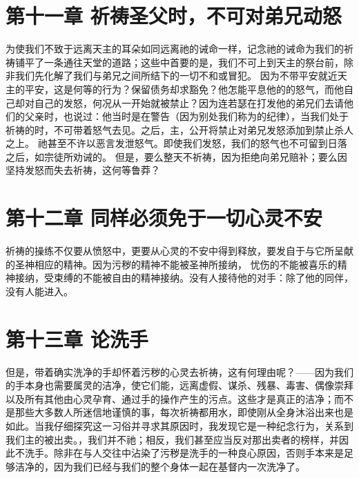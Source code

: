 
\section{第十一章 祈祷圣父时，不可对弟兄动怒}

为使我们不致于远离天主的耳朵如同远离祂的诫命一样，记念祂的诫命为我们的祈祷铺平了一条通往天堂的道路；这些中首要的是，我们不可上到天主的祭台前，除非我们先化解了我们与弟兄之间所结下的一切不和或冒犯。 因为不带平安就近天主的平安，这是何等的行为？保留债务却求豁免？他怎能平息他的的怒气，而他自己却对自己的发怒，何况从一开始就被禁止？因为连若瑟在打发他的弟兄们去请他们的父亲时，也说过：他当时是在警告（因为别处我们称为的纪律），当我们处于祈祷的时，不可带着怒气去见。之后，主，公开将禁止对弟兄发怒添加到禁止杀人之上。 祂甚至不许以恶言发泄怒气。即使我们发怒，我们的怒气也不可留到日落之后，如宗徒所劝诫的。 但是，要么整天不祈祷，因为拒绝向弟兄赔补；要么因坚持发怒而失去祈祷，这何等鲁莽？\par


\section{第十二章 同样必须免于一切心灵不安}

祈祷的操练不仅要从愤怒中，更要从心灵的不安中得到释放，要发自于与它所呈献的圣神相应的精神。因为污秽的精神不能被圣神所接纳， 忧伤的不能被喜乐的精神接纳，受束缚的不能被自由的精神接纳。没有人接待他的对手：除了他的同伴，没有人能进入。\par


\section{第十三章 论洗手}

但是，带着确实洗净的手却怀着污秽的心灵去祈祷，这有何理由呢？——因为我们的手本身也需要属灵的洁净，使它们能，远离虚假、谋杀、残暴、毒害、偶像崇拜以及所有其他由心灵孕育、通过手的操作产生的污点。这些才是真正的洁净；而不是那些大多数人所迷信地谨慎的事，每次祈祷都用水，即使刚从全身沐浴出来也是如此。当我仔细探究这一习俗并寻求其原因时，我发现它是一种纪念行为，关系到我们主的被出卖。，我们并不祂；相反，我们甚至应当反对那出卖者的榜样，并因此不洗手。除非在与人交往中沾染了污秽是洗手的一种良心原因，否则手本来是足够洁净的，因为我们已经与我们的整个身体一起在基督内一次洗净了。\par

